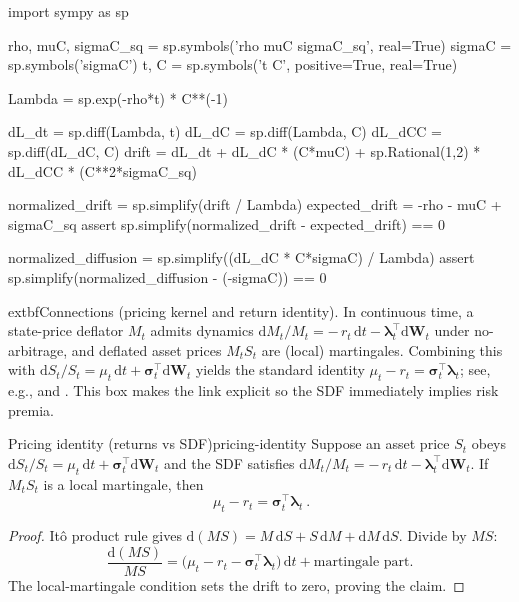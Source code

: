 ﻿\documentclass[11pt,letterpaper,oneside]{article}
\numberwithin{equation}{section}
\newcommand{\1}{\mathbf{1}}
\newcommand{\diff}{\mathrm{d}}
\begin{document}
\begin{sympycheck}[title={Verification: SDF dynamics via It\^o's Lemma}]
\begin{pyconsole}
import sympy as sp

rho, muC, sigmaC_sq = sp.symbols('rho muC sigmaC_sq', real=True)
sigmaC = sp.symbols('sigmaC')
t, C = sp.symbols('t C', positive=True, real=True)

Lambda = sp.exp(-rho*t) * C**(-1)

dL_dt = sp.diff(Lambda, t)
dL_dC = sp.diff(Lambda, C)
dL_dCC = sp.diff(dL_dC, C)
drift = dL_dt + dL_dC * (C*muC) + sp.Rational(1,2) * dL_dCC * (C**2*sigmaC_sq)

normalized_drift = sp.simplify(drift / Lambda)
expected_drift = -rho - muC + sigmaC_sq
assert sp.simplify(normalized_drift - expected_drift) == 0

normalized_diffusion = sp.simplify((dL_dC * C*sigmaC) / Lambda)
assert sp.simplify(normalized_diffusion - (-sigmaC)) == 0
\end{pyconsole}
\end{sympycheck}

\begin{tcolorbox}[literaturestyle]
	extbf{Connections (pricing kernel and return identity).} In continuous time, a state-price deflator $M_t$ admits dynamics $\diff M_t/M_t=-\,r_t\,\diff t-\bm{\lambda}_t^{\top}\diff\bm{W}_t$ under no-arbitrage, and deflated asset prices $M_t S_t$ are (local) martingales. Combining this with $\diff S_t/S_t=\mu_t\,\diff t+\bm{\sigma}_t^{\top}\diff\bm{W}_t$ yields the standard identity $\mu_t-r_t=\bm{\sigma}_t^{\top}\bm{\lambda}_t$; see, e.g., \cite[Eq.~(A.21)]{bjork2009} and \cite{cochrane2005}. This box makes the link explicit so the SDF immediately implies risk premia.
\end{tcolorbox}

\begin{proposition}{Pricing identity (returns vs SDF)}{pricing-identity}
Suppose an asset price $S_t$ obeys $\diff S_t/S_t=\mu_t\,\diff t+\bm{\sigma}_t^{\top}\diff\bm{W}_t$ and the SDF satisfies $\diff M_t/M_t=-\,r_t\,\diff t-\bm{\lambda}_t^{\top}\diff\bm{W}_t$. If $M_tS_t$ is a local martingale, then
\[
\boxed{\ \mu_t - r_t = \bm{\sigma}_t^{\top}\bm{\lambda}_t\ }.
\]
\end{proposition}
\begin{proof}
It\^o product rule gives $\diff(MS)=M\,\diff S+S\,\diff M+\diff M\,\diff S$. Divide by $MS$:
\[
\frac{\diff(MS)}{MS}=\Big(\mu_t-r_t-\bm{\sigma}_t^{\top}\bm{\lambda}_t\Big)\,\diff t+\text{martingale part}.
\]
The local-martingale condition sets the drift to zero, proving the claim.
\end{proof}
\end{document}
